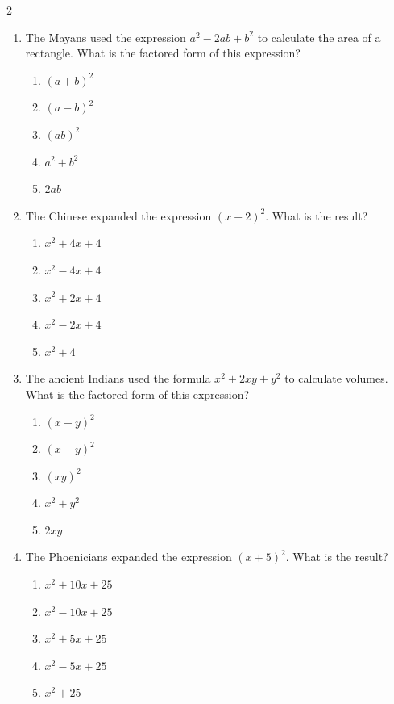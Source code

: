 \documentclass[10pt]{article}
\begin{document}
\begin{multicols}{2}
\begin{enumerate}[label=\textbf{Q\arabic*.}, leftmargin=*, itemsep=6pt, parsep=0pt]
  \item \small The Mayans used the expression $a^2 - 2ab + b^2$ to calculate the area of a rectangle. What is the factored form of this expression?
  \begin{enumerate}[label=(\Alph*), leftmargin=0.6cm, nosep, itemsep=2pt]
    \item $(a+b)^2$
    \item $(a-b)^2$
    \item $(ab)^2$
    \item $a^2 + b^2$
    \item $2ab$
  \end{enumerate}

  \item \small The Chinese expanded the expression $(x-2)^2$. What is the result?
  \begin{enumerate}[label=(\Alph*), leftmargin=0.6cm, nosep, itemsep=2pt]
    \item $x^2 + 4x + 4$
    \item $x^2 - 4x + 4$
    \item $x^2 + 2x + 4$
    \item $x^2 - 2x + 4$
    \item $x^2 + 4$
  \end{enumerate}

  \item \small The ancient Indians used the formula $x^2 + 2xy + y^2$ to calculate volumes. What is the factored form of this expression?
  \begin{enumerate}[label=(\Alph*), leftmargin=0.6cm, nosep, itemsep=2pt]
    \item $(x+y)^2$
    \item $(x-y)^2$
    \item $(xy)^2$
    \item $x^2 + y^2$
    \item $2xy$
  \end{enumerate}

  \item \small The Phoenicians expanded the expression $(x+5)^2$. What is the result?
  \begin{enumerate}[label=(\Alph*), leftmargin=0.6cm, nosep, itemsep=2pt]
    \item $x^2 + 10x + 25$
    \item $x^2 - 10x + 25$
    \item $x^2 + 5x + 25$
    \item $x^2 - 5x + 25$
    \item $x^2 + 25$
  \end{enumerate}


\end{enumerate}
\end{multicols}
\end{document}
